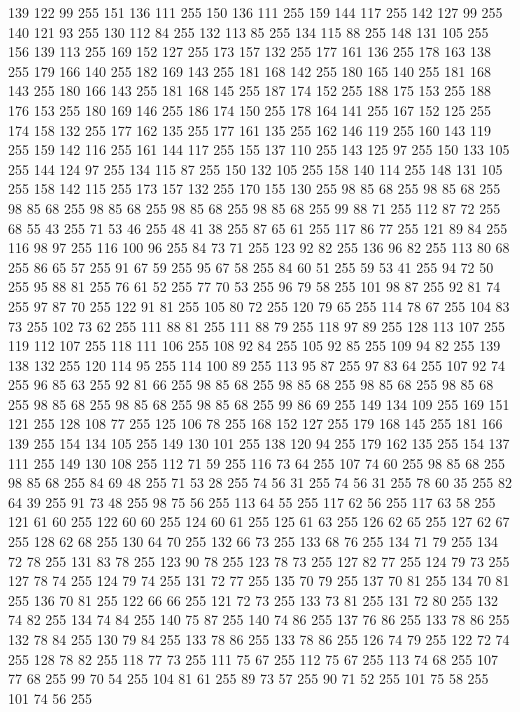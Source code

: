 139 122 99 255 151 136 111 255 150 136 111 255 159 144 117 255 142 127 99 255 140 121 93 255 130 112 84 255 132 113 85 255 134 115 88 255 148 131 105 255 156 139 113 255 169 152 127 255 173 157 132 255 177 161 136 255 178 163 138 255 179 166 140 255 182 169 143 255 181 168 142 255 180 165 140 255 181 168 143 255 180 166 143 255 181 168 145 255 187 174 152 255 188 175 153 255 188 176 153 255 180 169 146 255 186 174 150 255 178 164 141 255 167 152 125 255 174 158 132 255 177 162 135 255 177 161 135 255 162 146 119 255 160 143 119 255 159 142 116 255 161 144 117 255 155 137 110 255 143 125 97 255 150 133 105 255 144 124 97 255 134 115 87 255 150 132 105 255 158 140 114 255 148 131 105 255 158 142 115 255 173 157 132 255 170 155 130 255 98 85 68 255 98 85 68 255 98 85 68 255 98 85 68 255 98 85 68 255 98 85 68 255 99 88 71 255 112 87 72 255 68 55 43 255 71 53 46 255 48 41 38 255 87 65 61 255 117 86 77 255 121 89 84 255 116 98 97 255 116 100 96 255 84 73 71 255
123 92 82 255 136 96 82 255 113 80 68 255 86 65 57 255 91 67 59 255 95 67 58 255 84 60 51 255 59 53 41 255 94 72 50 255 95 88 81 255 76 61 52 255 77 70 53 255 96 79 58 255 101 98 87 255 92 81 74 255 97 87 70 255 122 91 81 255 105 80 72 255 120 79 65 255 114 78 67 255 104 83 73 255 102 73 62 255 111 88 81 255 111 88 79 255 118 97 89 255 128 113 107 255 119 112 107 255 118 111 106 255 108 92 84 255 105 92 85 255 109 94 82 255 139 138 132 255 120 114 95 255 114 100 89 255 113 95 87 255 97 83 64 255 107 92 74 255 96 85 63 255 92 81 66 255 98 85 68 255 98 85 68 255 98 85 68 255 98 85 68 255 98 85 68 255 98 85 68 255 98 85 68 255 99 86 69 255 149 134 109 255 169 151 121 255 128 108 77 255 125 106 78 255 168 152 127 255 179 168 145 255 181 166 139 255 154 134 105 255 149 130 101 255 138 120 94 255 179 162 135 255 154 137 111 255 149 130 108 255 112 71 59 255 116 73 64 255 107 74 60 255 98 85 68 255
98 85 68 255 84 69 48 255 71 53 28 255 74 56 31 255 74 56 31 255 78 60 35 255 82 64 39 255 91 73 48 255 98 75 56 255 113 64 55 255 117 62 56 255 117 63 58 255 121 61 60 255 122 60 60 255 124 60 61 255 125 61 63 255 126 62 65 255 127 62 67 255 128 62 68 255 130 64 70 255 132 66 73 255 133 68 76 255 134 71 79 255 134 72 78 255 131 83 78 255 123 90 78 255 123 78 73 255 127 82 77 255 124 79 73 255 127 78 74 255 124 79 74 255 131 72 77 255 135 70 79 255 137 70 81 255 134 70 81 255 136 70 81 255 122 66 66 255 121 72 73 255 133 73 81 255 131 72 80 255 132 74 82 255 134 74 84 255 140 75 87 255 140 74 86 255 137 76 86 255 133 78 86 255 132 78 84 255 130 79 84 255 133 78 86 255 133 78 86 255 126 74 79 255 122 72 74 255 128 78 82 255 118 77 73 255 111 75 67 255 112 75 67 255 113 74 68 255 107 77 68 255 99 70 54 255 104 81 61 255 89 73 57 255 90 71 52 255 101 75 58 255 101 74 56 255
